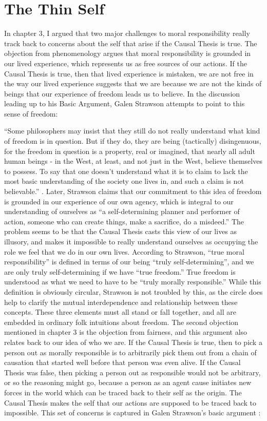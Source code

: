 \documentclass[phd,12pt,oneside,paper=letterpaper]{ubcthesis}
\begin{document}
\section{The Thin Self}
In chapter 3, I argued that two major challenges to moral responsibility really track back to concerns about the self that arise if the Causal Thesis is true. The objection from phenomenology argues that moral responsibility is grounded in our lived experience, which represents us as free sources of our actions. If the Causal Thesis is true, then that lived experience is mistaken, we are not free in the way our lived experience suggests that we are because we are not the kinds of beings that our experience of freedom leads us to believe. In the discussion leading up to his Basic Argument, Galen Strawson attempts to point to this sense of freedom:

``Some philosophers may insist that they still do not really understand what kind of freedom is in question. But if they do, they are being (tactically) disingenuous, for the freedom in question is a property, real or imagined, that nearly all adult human beings - in the West, at least, and not just in the West, believe themselves to possess. To say that one doesn't understand what it is to claim to lack the most basic understanding of the society one lives in, and such a claim is not believable.'' \citep[p.2]{strawsong2010}. 
Later, Strawson claims that our commitment to this idea of freedom is grounded in our experience of our own agency, which is integral to our understanding of ourselves as ``a self-determining planner and performer of action, someone who can create things, make a sacrifice, do a misdeed.'' \citep[p.95]{strawsong2010} The problem seems to be that the Causal Thesis casts this view of our lives as illusory, and makes it impossible to really understand ourselves as occupying the role we feel that we do in our own lives. According to Strawson, ``true moral responsibility'' is defined in terms of our being ``truly self-determining'', and we are only truly self-determining if we have ``true freedom.'' True freedom is understood as what we need to have to be ``truly morally responsible.'' While this definition is obviously circular, Strawson is not troubled by this, as the circle does help to clarify the mutual interdependence and relationship between these concepts. These three elements must all stand or fall together, and all are embedded in ordinary folk intuitions about freedom. 
The second objection mentioned in chapter 3 is the objection from fairness, and this argument also relates back to our idea of who we are. If the Causal Thesis is true, then to pick a person out as morally responsible is to arbitrarily pick them out from a chain of causation that started well before that person was even alive. If the Causal Thesis was false, then picking a person out as responsible would not be arbitrary, or so the reasoning might go, because a person as an agent cause initiates new forces in the world which can be traced back to their self as the origin. The Causal Thesis makes the self that our actions are supposed to be traced back to impossible. This set of concerns is captured in Galen Strawson's basic argument \citep[p24-5]{strawsong2010}:
\end{document}
